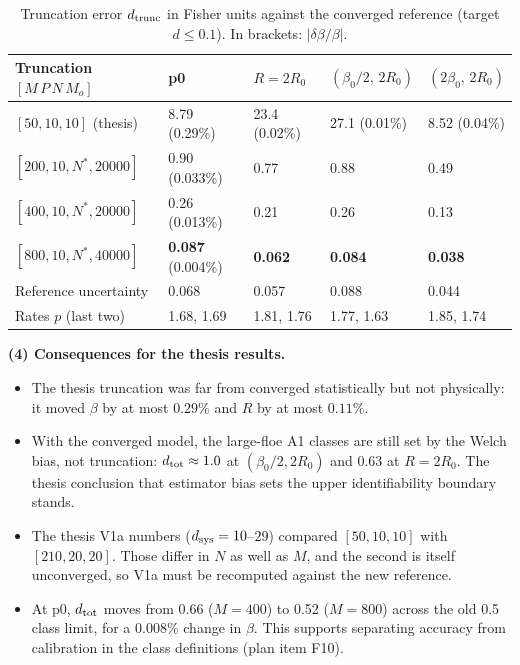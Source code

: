 \documentclass[10pt,a4paper]{article}
\begin{document}
\begin{table}[h]\centering\small
\caption{Truncation error $d_{\rm trunc}$ in Fisher units against the converged reference (target $d\le0.1$). In brackets: $|\delta\beta/\beta|$.}\label{tab:g1}
\begin{tabular}{@{}lllll@{}}
\toprule
Truncation $[M\,P\,N\,M_o]$ & p0 & $R=2R_0$ & $(\beta_0/2,\,2R_0)$ & $(2\beta_0,\,2R_0)$ \\
\midrule
$[50,10,10]$ (thesis) & 8.79 (0.29\%) & 23.4 (0.02\%) & 27.1 (0.01\%) & 8.52 (0.04\%) \\
$[200,10,N^*,20000]$ & 0.90 (0.033\%) & 0.77 & 0.88 & 0.49 \\
$[400,10,N^*,20000]$ & 0.26 (0.013\%) & 0.21 & 0.26 & 0.13 \\
$[800,10,N^*,40000]$ & \textbf{0.087} (0.004\%) & \textbf{0.062} & \textbf{0.084} & \textbf{0.038} \\
\midrule
Reference uncertainty & 0.068 & 0.057 & 0.088 & 0.044 \\
Rates $p$ (last two) & 1.68, 1.69 & 1.81, 1.76 & 1.77, 1.63 & 1.85, 1.74 \\
\bottomrule
\end{tabular}
\end{table}

\textbf{(4) Consequences for the thesis results.}
\begin{itemize}
\item The thesis truncation was far from converged statistically but not physically: it moved $\beta$ by at most $0.29\%$ and $R$ by at most $0.11\%$.
\item With the converged model, the large-floe A1 classes are still set by the Welch bias, not truncation: $d_{\rm tot}\approx1.0$ at $(\beta_0/2,2R_0)$ and $0.63$ at $R=2R_0$. The thesis conclusion that estimator bias sets the upper identifiability boundary stands.
\item The thesis V1a numbers ($d_{\rm sys}=10$--$29$) compared $[50,10,10]$ with $[210,20,20]$. Those differ in $N$ as well as $M$, and the second is itself unconverged, so V1a must be recomputed against the new reference.
\item At p0, $d_{\rm tot}$ moves from 0.66 ($M=400$) to 0.52 ($M=800$) across the old 0.5 class limit, for a $0.008\%$ change in $\beta$. This supports separating accuracy from calibration in the class definitions (plan item F10).
\end{itemize}
\end{document}
